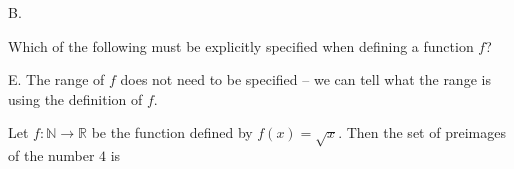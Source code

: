 \documentclass[addpoints]{exam}
\begin{document}
\begin{questions}
	\begin{solution}
		B. 
	\end{solution}
	

\question[2] Which of the following must be explicitly specified when defining a function $f$? 
	
	\begin{solution}
		E. The range of $f$ does not need to be specified -- we can tell what the range is using the definition of $f$. 
	\end{solution}
	

\question[2] Let $f: \mathbb{N} \rightarrow \mathbb{R}$ be the function defined by $f(x) = \sqrt{x}$. Then the set of preimages of the number $4$ is 


\end{questions}
\end{document}
